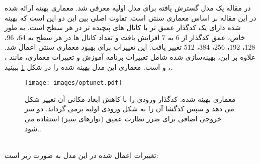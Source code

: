 در مقاله \cite{futrega2021optimized} یک مدل گسترش یافته برای مدل  اولیه معرفی شد. معماری  بهینه ارائه شده در این مقاله بر اساس معماری سنتی  است. تفاوت اصلی بین این دو این است که  بهینه شده دارای یک کدگذار عمیق تر با کانال های پیچیده تر در هر سطح است. به طور خاص، عمق کدگذار از 6 به 7 افزایش یافت و تعداد کانال ها در هر سطح به 64، 96، 128، 192، 256، 384، 512 تغییر یافت. این تغییرات برای بهبود معماری سنتی  اعمال شد. علاوه بر این،  بهینه‌سازی شده شامل تغییرات برنامه آموزش و تغییرات معماری، مانند ، ، و است. معماری این مدل بهینه شده را در شکل \ref{fig:optunet} ببینید.
\begin{figure}[h]
\centerline{\texttt{[image: images/optunet.pdf]}}
\caption[معماری  بهینه شده]{
   معماری  بهینه شده. کدگذار ورودی را با کاهش ابعاد مکانی آن تغییر شکل می دهد و سپس کدگشا آن را به شکل ورودی اولیه برمی گرداند. دو سر خروجی اضافی برای ضرر نظارت عمیق (نوارهای سبز) استفاده می شود.\cite{futrega2021optimized}. }
\label{fig:optunet}
\end{figure}
\\
تغییرات اعمال شده در این مدل به صورت زیر است:
